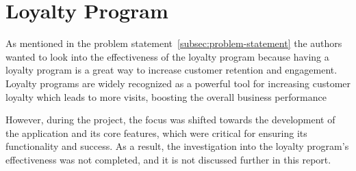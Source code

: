 \section{Loyalty Program}\label{sec:loyalty-program}

As mentioned in the problem statement~\ref{subsec:problem-statement} the authors wanted to look into the effectiveness
of the loyalty program because having a loyalty program is a great way to increase customer retention and
engagement.
Loyalty programs are widely recognized as a powerful tool for increasing customer loyalty which leads to more visits,
boosting the overall business performance

However, during the project, the focus was shifted towards the development of the application and its core features,
which were critical for ensuring its functionality and success.
As a result, the investigation into the loyalty program's effectiveness was not completed,
and it is not discussed further in this report.
